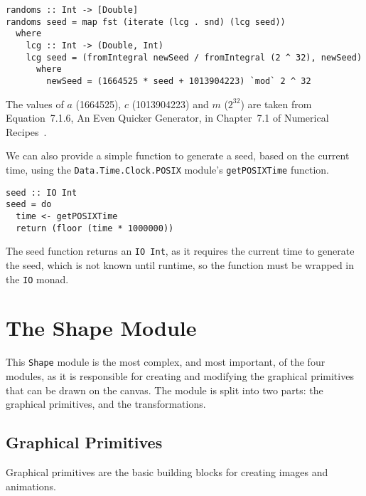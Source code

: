 \documentclass[../main.tex]{subfiles}
\begin{document}
            \begin{lstlisting}[label={lst:random}, caption={The random number
                generator, which uses a linear congruential generator to generate an infinite
                list of pseudo-random numbers, mapped to the range [0, 1].}]
randoms :: Int -> [Double]
randoms seed = map fst (iterate (lcg . snd) (lcg seed))
  where
    lcg :: Int -> (Double, Int)
    lcg seed = (fromIntegral newSeed / fromIntegral (2 ^ 32), newSeed)
      where
        newSeed = (1664525 * seed + 1013904223) `mod` 2 ^ 32\end{lstlisting}

            The values of $a$ (1664525), $c$ (1013904223) and $m$ ($2^32$) are taken from
                Equation~7.1.6, An Even Quicker Generator, in Chapter~7.1 of Numerical
                Recipes~\citep{numericalRecipes}.

            We can also provide a simple function to generate a seed, based on the current
                time, using the \verb|Data.Time.Clock.POSIX| module's \verb|getPOSIXTime|
                function.

            \begin{lstlisting}[label={lst:seed}, caption={The seed function.}]
seed :: IO Int
seed = do
  time <- getPOSIXTime
  return (floor (time * 1000000))\end{lstlisting}

            The seed function returns an \verb|IO Int|, as it requires the current time to
                generate the seed, which is not known until runtime, so the function must be
                wrapped in the \verb|IO| monad.

    \section{The Shape Module}
        This \verb|Shape| module is the most complex, and most important, of the four
            modules, as it is responsible for creating and modifying the graphical
            primitives that can be drawn on the canvas.
        The module is split into two parts: the graphical primitives, and the
            transformations.

        \subsection{Graphical Primitives}
            Graphical primitives are the basic building blocks for creating images and
                animations.
\end{document}
